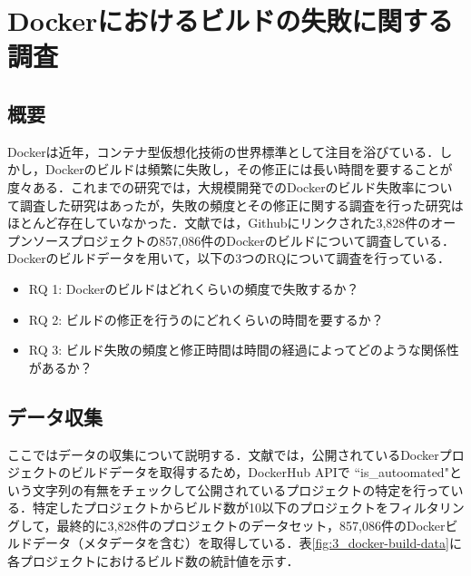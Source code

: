 \section{Dockerにおけるビルドの失敗に関する調査\cite{docker-failures}}
\subsection{概要}
Dockerは近年，コンテナ型仮想化技術の世界標準として注目を浴びている．しかし，Dockerのビルドは頻繁に失敗し，その修正には長い時間を要することが度々ある．これまでの研究では，大規模開発でのDockerのビルド失敗率について調査した研究はあったが，失敗の頻度とその修正に関する調査を行った研究はほとんど存在していなかった．文献\cite{docker-failures}では，Githubにリンクされた3,828件のオープンソースプロジェクトの857,086件のDockerのビルドについて調査している．Dockerのビルドデータを用いて，以下の3つのRQについて調査を行っている．

\begin{itemize}
  \item RQ 1: Dockerのビルドはどれくらいの頻度で失敗するか？
  \item RQ 2: ビルドの修正を行うのにどれくらいの時間を要するか？
  \item RQ 3: ビルド失敗の頻度と修正時間は時間の経過によってどのような関係性があるか？
\end{itemize}


\subsection{データ収集}
ここではデータの収集について説明する．文献\cite{docker-failures}では，公開されているDockerプロジェクトのビルドデータを取得するため，DockerHub APIで ``is\_autoomated"という文字列の有無をチェックして公開されているプロジェクトの特定を行っている．特定したプロジェクトからビルド数が10以下のプロジェクトをフィルタリングして，最終的に3,828件のプロジェクトのデータセット，857,086件のDockerビルドデータ（メタデータを含む）を取得している．表\ref{fig:3_docker-build-data}に各プロジェクトにおけるビルド数の統計値を示す．


